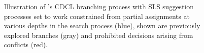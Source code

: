 \begin{figure}[]
\caption[CDCL branching process with SLS depths]{Illustration of \dagster's CDCL branching process with SLS suggestion processes set to work constrained from partial assignments at various depths in the search process (blue), shown are previously explored branches (gray) and prohibited decisions arising from conflicts (red).}
\label{fig:dpll_with_sls}
\end{figure}